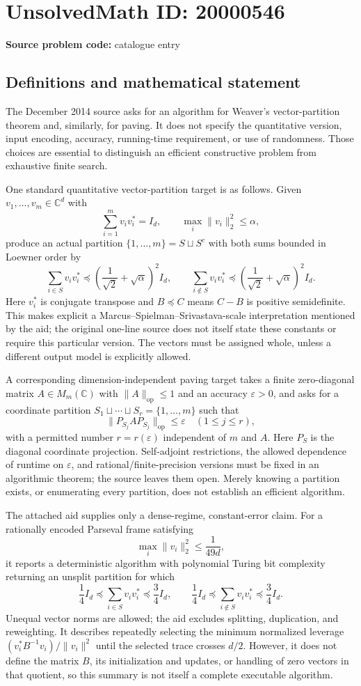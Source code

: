 \documentclass[11pt]{article}
\newcommand{\C}{\mathbb{C}}
\begin{document}
\section*{UnsolvedMath ID: 20000546}
\textbf{Source problem code:} catalogue entry
\subsection{Definitions and mathematical statement}
The December 2014 source asks for an algorithm for Weaver's vector-partition theorem and, similarly, for paving. It does not specify the quantitative version, input encoding, accuracy, running-time requirement, or use of randomness. Those choices are essential to distinguish an efficient constructive problem from exhaustive finite search.

One standard quantitative vector-partition target is as follows. Given \(v_1,\ldots,v_m\in\C^d\) with
\[
\sum_{i=1}^m v_iv_i^*=I_d,\qquad \max_i\|v_i\|_2^2\leq\alpha,
\]
produce an actual partition \(\{1,\ldots,m\}=S\sqcup S^c\) with both sums bounded in Loewner order by
\[
\sum_{i\in S}v_iv_i^*\preceq\left(\frac1{\sqrt2}+\sqrt\alpha\right)^2I_d,
\qquad
\sum_{i\notin S}v_iv_i^*\preceq\left(\frac1{\sqrt2}+\sqrt\alpha\right)^2I_d.
\]
Here \(v_i^*\) is conjugate transpose and \(B\preceq C\) means \(C-B\) is positive semidefinite. This makes explicit a Marcus--Spielman--Srivastava-scale interpretation mentioned by the aid; the original one-line source does not itself state these constants or require this particular version. The vectors must be assigned whole, unless a different output model is explicitly allowed.

A corresponding dimension-independent paving target takes a finite zero-diagonal matrix \(A\in M_m(\C)\) with \(\|A\|_{\mathrm{op}}\leq1\) and an accuracy \(\varepsilon>0\), and asks for a coordinate partition \(S_1\sqcup\cdots\sqcup S_r=\{1,\ldots,m\}\) such that
\[
\|P_{S_j}AP_{S_j}\|_{\mathrm{op}}\leq\varepsilon\quad(1\leq j\leq r),
\]
with a permitted number \(r=r(\varepsilon)\) independent of \(m\) and \(A\). Here \(P_S\) is the diagonal coordinate projection. Self-adjoint restrictions, the allowed dependence of runtime on \(\varepsilon\), and rational/finite-precision versions must be fixed in an algorithmic theorem; the source leaves them open. Merely knowing a partition exists, or enumerating every partition, does not establish an efficient algorithm.

The attached aid supplies only a dense-regime, constant-error claim. For a rationally encoded Parseval frame satisfying
\[
\max_i\|v_i\|_2^2\leq\frac1{49d},
\]
it reports a deterministic algorithm with polynomial Turing bit complexity returning an unsplit partition for which
\[
\frac14 I_d\preceq\sum_{i\in S}v_iv_i^*\preceq\frac34 I_d,
\qquad
\frac14 I_d\preceq\sum_{i\notin S}v_iv_i^*\preceq\frac34 I_d.
\]
Unequal vector norms are allowed; the aid excludes splitting, duplication, and reweighting. It describes repeatedly selecting the minimum normalized leverage \((v_i^*B^{-1}v_i)/\|v_i\|^2\) until the selected trace crosses \(d/2\). However, it does not define the matrix \(B\), its initialization and updates, or handling of zero vectors in that quotient, so this summary is not itself a complete executable algorithm.
\end{document}
